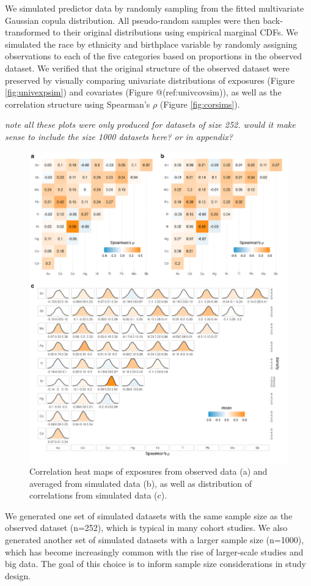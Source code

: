 \documentclass[12pt, twoside]{amherstthesis}
\begin{document}
We simulated predictor data by randomly sampling from the fitted multivariate Gaussian copula distribution. All pseudo-random samples were then back-transformed to their original distributions using empirical marginal CDFs. We simulated the race by ethnicity and birthplace variable by randomly assigning observations to each of the five categories based on proportions in the observed dataset. We verified that the original structure of the observed dataset were preserved by visually comparing univariate distributions of exposures (Figure \ref{fig:univexpsim}) and covariates (Figure @(ref:univcovsim)), as well as the correlation structure using Spearman's \(\rho\) (Figure \ref{fig:corsims}).

\emph{note all these plots were only produced for datasets of size 252. would it make sense to include the size 1000 datasets here? or in appendix?}
\begin{figure}

{\centering \includegraphics[width=1\linewidth]{figures/ch4_corr_simorigdens} 

}

\caption{Correlation heat maps of exposures from observed data (a) and averaged from simulated data (b), as well as distribution of correlations from simulated data (c).}\label{fig:corsimslg}
\end{figure}
We generated one set of simulated datasets with the same sample size as the observed dataset (n=252), which is typical in many cohort studies. We also generated another set of simulated datasets with a larger sample size (n=1000), which has become increasingly common with the rise of larger-scale studies and big data. The goal of this choice is to inform sample size considerations in study design.
\end{document}
